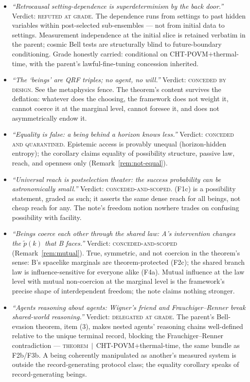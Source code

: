 \documentclass[11pt]{article}
\newcommand{\THMC}[1]{{\normalfont\scshape theorem}$\,\mid\,${\normalfont\small #1}} %
\begin{document}
\begin{itemize}
what the theorem delivers --- is that the constraint is not wielded by anything
against anyone. Cross-reference FW-A1.
\item[\textbf{FW-A4}] \emph{``Retrocausal setting-dependence is superdeterminism
by the back door.''} Verdict: \textsc{refuted at grade}. The dependence runs
from settings to past hidden variables within post-selected sub-ensembles ---
not from initial data to settings. Measurement independence at the initial
slice is retained verbatim in the parent; cosmic Bell tests are structurally
blind to future-boundary conditioning. Grade honestly carried: conditional on
\textsf{CHT-POVM}$+$thermal-time, with the parent's lawful-fine-tuning
concession inherited.
\item[\textbf{FW-A5}] \emph{``The `beings' are QRF triples; no agent, no will.''}
Verdict: \textsc{conceded by design}. See the metaphysics fence. The theorem's
content survives the deflation: whatever does the choosing, the framework
does not weight it, cannot coerce it at the marginal level, cannot foresee it,
and does not asymmetrically endow it.
\item[\textbf{FW-A6}] \emph{``Equality is false: a being behind a horizon knows
less.''} Verdict: \textsc{conceded and quarantined}. Epistemic access is
provably unequal (horizon-hidden entropy); the corollary claims equality of
possibility structure, passive law, reach, and openness only
(Remark~\ref{rem:not-equal}).
\item[\textbf{FW-A7}] \emph{``Universal reach is postselection theater: the
success probability can be astronomically small.''} Verdict:
\textsc{conceded-and-scoped}. (F1c) is a possibility statement, graded as such;
it asserts the same dense reach for all beings, not cheap reach for any. The
note's freedom notion nowhere trades on confusing possibility with facility.
\item[\textbf{FW-A8}] \emph{``Beings coerce each other through the shared law:
A's intervention changes the $\widetilde p(k)$ that B faces.''} Verdict:
\textsc{conceded-and-scoped} (Remark~\ref{rem:mutual}). True, symmetric, and
not coercion in the theorem's sense: B's spacelike marginals are
theorem-protected (F2c); the shared branch law is influence-sensitive for
everyone alike (F4a). Mutual influence at the law level with mutual
non-coercion at the marginal level is the framework's precise shape of
interdependent freedom; the note claims nothing stronger.
\item[\textbf{FW-A9}] \emph{``Agents reasoning about agents: Wigner's friend
and Frauchiger--Renner break shared-world reasoning.''} Verdict:
\textsc{delegated at grade}. The parent's Bell-evasion theorem, item (3),
makes nested agents' reasoning chains well-defined relative to the unique
terminal record, blocking the Frauchiger--Renner contradiction ---
\THMC{\textsf{CHT-POVM}$+$thermal-time}, the same bundle as F2b/F3b.
A being coherently manipulated as another's measured system is outside the
record-generating protocol class; the equality corollary speaks of
record-generating beings.
\end{itemize}
\end{document}
